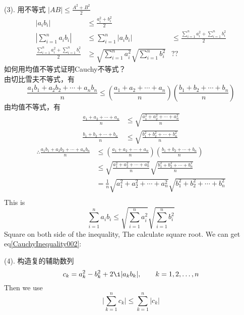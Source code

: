 (3). 用不等式 $ |AB| \le \frac{A^2+B^2}{2} $
\begin{align*}
	|a_ib_i| &\le \frac{a_i^2+b_i^2}{2}&\\
	|\sum_{i=1}^na_ib_i| &\le \sum_{i=1}^n|a_ib_i|&\le \frac{\sum_{i=1}^n a_i^2+\sum_{i=1}^n b_i^2}{2}\\
	\frac{\sum_{i=1}^na_i^2+\sum_{i=1}^nb_i^2}{2} &\ge \sqrt{\sum_{i=1}^n a_i^2} \sqrt{\sum_{i=1}^n b_i^2} &\text{??}
\end{align*}
如何用均值不等式证明Cauchy不等式？\\
由切比雪夫不等式，有
\begin{equation}\label{CauchyInequality002}
	\frac{a_1b_1+a_2b_2+\cdots+a_nb_n}{n} \le (\frac{a_1+a_2+\cdots+a_n}{n}) (\frac{b_1+b_2+\cdots+b_n}{n})
\end{equation}
由均值不等式，有
\begin{align*}
	\frac{a_1+a_2+\cdots+a_n}{n} &\le \sqrt{\frac{a_1^2+a_2^2+\cdots+a_n^2}{n}}\\
	\frac{b_1+b_2+\cdots+b_n}{n} &\le \sqrt{\frac{b_1^2+b_2^2+\cdots+b_n^2}{n}}
\end{align*}
\begin{align*}
	\therefore \frac{a_1b_1+a_2b_2+\cdots+a_nb_n}{n} 
	&\le (\frac{a_1+a_2+\cdots+a_n}{n}) (\frac{b_1+b_2+\cdots+b_n}{n}) \\
	&\le \sqrt{\frac{a_1^2+a_2^2+\cdots+a_n^2}{n}} \sqrt{\frac{b_1^2+b_2^2+\cdots+b_n^2}{n}}\\
	& = \frac{1}{n}\sqrt{a_1^2+a_2^2+\cdots+a_n^2} \sqrt{b_1^2+b_2^2+\cdots+b_n^2}\\
\end{align*}
This is 
\begin{equation*}
	\sum_{i=1}^n a_i b_i \le \sqrt{\sum_{i=1}^n a_i^2} \sqrt{\sum_{i=1}^n b_i^2}
\end{equation*}
Square on both side of the inequality, The calculate square root. We can get eq\ref{CauchyInequality002}:

(4). 构造复的辅助数列
\begin{equation*}
	c_k = a_k^2 - b_k^2 + 2\i |a_k b_k|, \qquad k = 1,2,\dots, n
\end{equation*}
Then we use
\begin{equation*}
	\Big|\sum_{k=1}^n c_k\Big| \le \sum_{k=1}^n |c_k|
\end{equation*}

